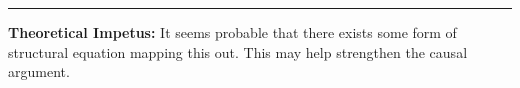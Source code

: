 \documentclass[12pt,letterpaper,doublespace, oneside]{article}
\begin{document}










\noindent\rule{\linewidth}{0.4pt}

\noindent\textbf{Theoretical Impetus:} 
It seems probable that there exists some form of structural equation mapping this out. This may help strengthen the causal argument. 


\newpage


\end{document}
